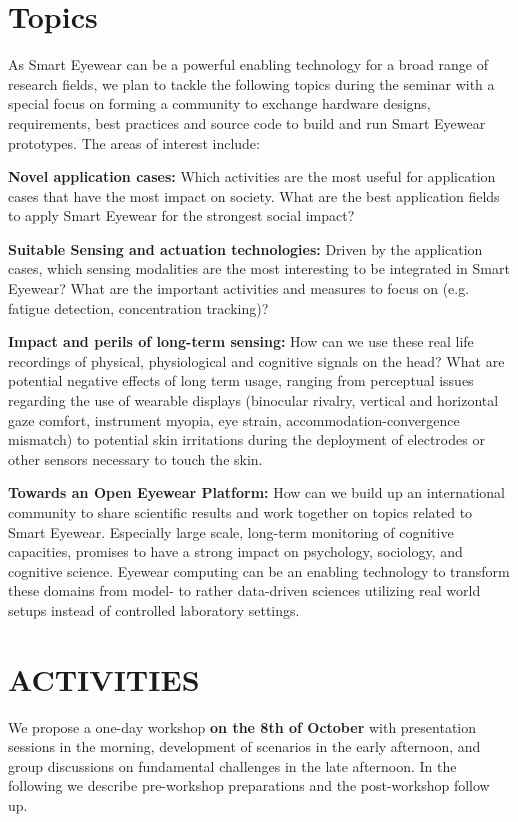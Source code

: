 \documentclass{sigchi-ext}
\begin{document}
\section{Topics}

As Smart Eyewear can be a powerful enabling technology for a broad range of research fields, we plan to tackle the following topics during the seminar with a special focus on forming a community to exchange hardware designs, requirements, best practices and source code to build and run Smart Eyewear prototypes. The areas of interest include:

 {\bf Novel application cases:} Which activities are the most useful for application cases that have the most impact on society. What are the best application fields to apply Smart Eyewear for the strongest social impact?
 
{\bf Suitable Sensing and actuation technologies:} Driven by the application cases, which sensing modalities are the most interesting to be integrated in Smart Eyewear? What are the important activities and measures to focus on (e.g. fatigue detection, concentration tracking)? 

 {\bf Impact and perils of long-term sensing:} How can we use these real life recordings of physical, physiological and cognitive signals on the head? What are potential negative effects of long term usage, ranging from perceptual issues regarding the use of wearable displays (binocular rivalry, vertical and horizontal gaze comfort, instrument myopia, eye strain, accommodation-convergence mismatch) to potential skin irritations during the deployment of electrodes or other sensors necessary to touch the skin. 

{\bf Towards an Open Eyewear Platform:} How can we build up an international community to share scientific results and work together on topics related to Smart Eyewear. Especially large scale, long-term monitoring of cognitive capacities, promises to have a strong impact on psychology, sociology, and cognitive science. Eyewear computing can be an enabling technology to transform these domains from model- to rather data-driven sciences utilizing real world setups instead of controlled laboratory settings.

\section{ACTIVITIES}
We propose a one-day workshop {\bf on the 8th of October} with presentation sessions in the morning, development of scenarios in the early afternoon, and group discussions on fundamental challenges in the late afternoon. In the following we describe pre-workshop preparations and the post-workshop follow up.
\end{document}

